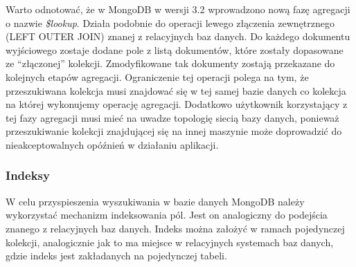 Warto odnotować, że w MongoDB w wersji 3.2 wprowadzono nową fazę agregacji o nazwie \textit{\$lookup}.
Działa podobnie do operacji lewego złączenia zewnętrznego (LEFT OUTER JOIN) znanej z relacyjnych baz danych.
Do każdego dokumentu wyjściowego zostaje dodane pole z listą dokumentów, które zostały dopasowane ze \enquote{złączonej} kolekcji.
Zmodyfikowane tak dokumenty zostają przekazane do kolejnych etapów agregacji.
Ograniczenie tej operacji polega na tym, że przeszukiwana kolekcja musi znajdować się w tej samej bazie danych co kolekcja na której wykonujemy operację agregacji.
Dodatkowo użytkownik korzystający z tej fazy agregacji musi mieć na uwadze topologię siecią bazy danych, ponieważ przeszukiwanie kolekcji znajdującej się na innej maszynie może doprowadzić do nieakceptowalnych opóźnień w działaniu aplikacji.

\subsubsection{Indeksy}

W celu przyspieszenia wyszukiwania w bazie danych MongoDB należy wykorzystać mechanizm indeksowania pól.
Jest on analogiczny do podejścia znanego z relacyjnych baz danych.
Indeks można założyć w ramach pojedynczej kolekcji, analogicznie jak to ma miejsce w relacyjnych systemach baz danych, gdzie indeks jest zakładanych na pojedynczej tabeli.


